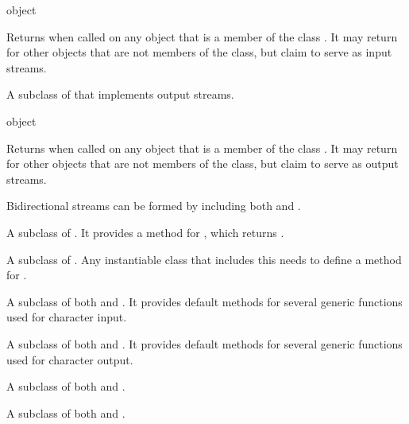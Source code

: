  {object}

Returns  when called on any object that is a member of the class
.  It may return  for other objects that
are not members of the  class, but claim to serve
as input streams.



A subclass of  that implements output streams.

 {object}

Returns  when called on any object that is a member of the class
.  It may return  for other objects
that are not members of the  class, but claim to
serve as output streams.

Bidirectional streams can be formed by including both
 and .



A subclass of .  It provides a method for
, which returns .

    
A subclass of .  Any instantiable class that includes
this needs to define a method for .



A subclass of both  and
.  It provides default methods for several
generic functions used for character input.


A subclass of both  and
.  It provides default methods for several
generic functions used for character output.



A subclass of both  and
.



A subclass of both  and
.


